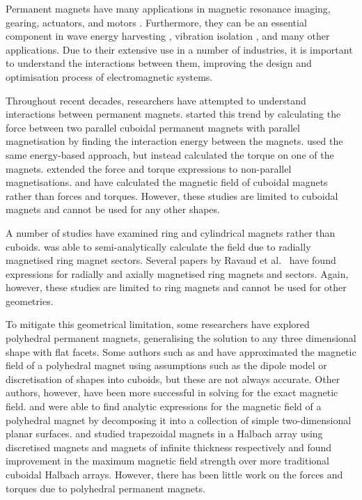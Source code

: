 Permanent magnets have many applications in magnetic resonance imaging, gearing, actuators, and motors \cite{Furlani2001}. Furthermore, they can be an essential component in wave energy harvesting \cite{Mann2010}, vibration isolation \cite{Robertson2009}, and many other applications. Due to their extensive use in a number of industries, it is important to understand the interactions between them, improving the design and optimisation process of electromagnetic systems.

Throughout recent decades, researchers have attempted to understand interactions between permanent magnets. \textcite{Akoun1984} started this trend by calculating the force between two parallel cuboidal permanent magnets with parallel magnetisation by finding the interaction energy between the magnets. \textcite{Janssen2010} used the same energy-based approach, but instead calculated the torque on one of the magnets. \textcite{Allag2009} extended the force and torque expressions to non-parallel magnetisations. \textcite{EngelHerbert2005} and \textcite{Ravaud2009} have calculated the magnetic field of cuboidal magnets rather than forces and torques. However, these studies are limited to cuboidal magnets and cannot be used for any other shapes.

A number of studies have examined ring and cylindrical magnets rather than cuboids. \textcite{Furlani1995} was able to semi-analytically calculate the field due to radially magnetised ring magnet sectors. Several papers by Ravaud et al.\ \cite{Ravaud2008,Ravaud2008a,Ravaud2009a} have found expressions for radially and axially magnetised ring magnets and sectors. Again, however, these studies are limited to ring magnets and cannot be used for other geometries.

To mitigate this geometrical limitation, some researchers have explored polyhedral permanent magnets, generalising the solution to any three dimensional shape with flat facets. Some authors such as \textcite{Soltner2010} and \textcite{Meessen2008} have approximated the magnetic field of a polyhedral magnet using assumptions such as the dipole model or discretisation of shapes into cuboids, but these are not always accurate. Other authors, however, have been more successful in solving for the exact magnetic field. \textcite{Janssen2010a} and \textcite{Rubeck2013} were able to find analytic expressions for the magnetic field of a polyhedral magnet by decomposing it into a collection of simple two-dimensional planar surfaces. \textcite{Meessen2008} and \textcite{Lee2004} studied trapezoidal magnets in a Halbach array using discretised magnets and magnets of infinite thickness respectively and found improvement in the maximum magnetic field strength over more traditional cuboidal Halbach arrays. However, there has been little work on the forces and torques due to polyhedral permanent magnets.

